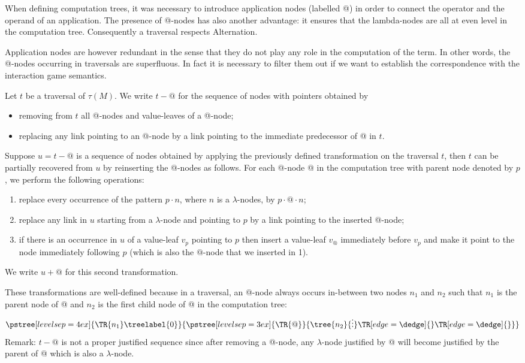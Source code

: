 When defining computation trees, it was necessary to introduce
application nodes (labelled @) in order to connect the operator and
the operand of an application. The presence of @-nodes has also
another advantage: it ensures that the lambda-nodes are all at even
level in the computation tree. Consequently a traversal respects
Alternation.

Application nodes are however redundant in the sense that they do
not play any role in the computation of the term. In other words,
the @-nodes occurring in traversals are superfluous. In fact it is
necessary to filter them out if we want to establish the
correspondence with the interaction game semantics.

\begin{dfn}
\label{dfn:appnode_filter}
Let $t$ be a traversal of $\tau(M)$.
We write $t-@$ for the sequence of nodes with pointers obtained by
\begin{itemize}
\item removing from $t$ all @-nodes and value-leaves of a @-node;
\item replacing any link pointing to an @-node by a link pointing to the immediate predecessor of @ in $t$.
\end{itemize}

Suppose $u = t-@$ is a sequence of nodes obtained by applying the
previously defined transformation on the traversal $t$, then $t$ can
be partially recovered from $u$ by reinserting the @-nodes as
follows. For each @-node @ in the computation tree with parent node
denoted by $p$, we perform the following operations:
\begin{enumerate}
\item replace every occurrence of the pattern $p \cdot n$, where $n$ is a $\lambda$-nodes,
by $p \cdot @ \cdot n$;
\item replace any link in $u$ starting from a $\lambda$-node and pointing to $p$ by a link pointing to the inserted @-node;
\item if there is an occurrence in $u$ of a value-leaf $v_p$ pointing to $p$ then insert a value-leaf $v_@$
immediately before $v_p$ and make it point to the node immediately
following $p$ (which is also the $@$-node that we inserted in 1).
\end{enumerate}
We write $u+@$ for this second transformation.
\end{dfn}
These transformations are well-defined because in a traversal, an @-node
always occurs in-between two nodes $n_1$ and $n_2$ such that  $n_1$ is the parent node of @
and $n_2$ is the first child node of @ in the computation tree:
$$      \pstree[levelsep=4ex]{\TR{n_1}\treelabel{0} }
        {
            \pstree[levelsep=3ex]{\TR{@}}
            {
                \tree{n_2}{\vdots}
                \TR[edge=\dedge]{}
                \TR[edge=\dedge]{}
            }
        }
$$
Remark: $t-@$ is not a proper justified sequence
since after removing a @-node, any $\lambda$-node justified by @ will become
justified by the parent of @ which is also a $\lambda$-node.

